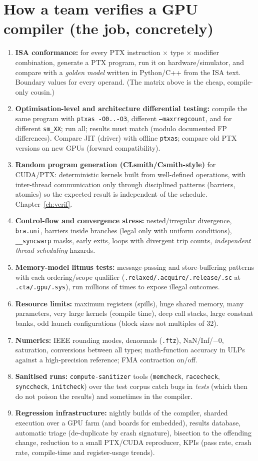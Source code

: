 \documentclass[10pt,a4paper,openany,oneside]{report}
\newcommand{\prio}[1]{\texorpdfstring{\ifcase#1\or{\color{gold}\ding{72}}\or{\color{gold}\ding{72}\ding{72}}\or{\color{gold}\ding{72}\ding{72}\ding{72}}\fi}{}}
\begin{document}
\section{How a team verifies a GPU compiler (the job, concretely) \prio{3}}
\begin{enumerate}[nosep]
\item \textbf{ISA conformance:} for every PTX instruction $\times$ type $\times$ modifier combination, generate a PTX program, run it on hardware/simulator, and compare with a \emph{golden model} written in Python/C++ from the ISA text. Boundary values for every operand. (The matrix above is the cheap, compile-only cousin.)
\item \textbf{Optimisation-level and architecture differential testing:} compile the same program with \texttt{ptxas -O0..-O3}, different \texttt{--maxrregcount}, and for different \texttt{sm\_XX}; run all; results must match (modulo documented FP differences). Compare JIT (driver) with offline \texttt{ptxas}; compare old PTX versions on new GPUs (forward compatibility).
\item \textbf{Random program generation (CLsmith/Csmith-style)} for CUDA/PTX: deterministic kernels built from well-defined operations, with inter-thread communication only through disciplined patterns (barriers, atomics) so the expected result is independent of the schedule. Chapter~\ref{ch:verif}.
\item \textbf{Control-flow and convergence stress:} nested/irregular divergence, \texttt{bra.uni}, barriers inside branches (legal only with uniform conditions), \texttt{\_\_syncwarp} masks, early exits, loops with divergent trip counts, \emph{independent thread scheduling} hazards.
\item \textbf{Memory-model litmus tests:} message-passing and store-buffering patterns with each ordering/scope qualifier (\texttt{.relaxed/.acquire/.release/.sc} at \texttt{.cta/.gpu/.sys}), run millions of times to expose illegal outcomes.
\item \textbf{Resource limits:} maximum registers (spills), huge shared memory, many parameters, very large kernels (compile time), deep call stacks, large constant banks, odd launch configurations (block sizes not multiples of 32).
\item \textbf{Numerics:} IEEE rounding modes, denormals (\texttt{.ftz}), NaN/Inf/$-0$, saturation, conversions between all types; math-function accuracy in ULPs against a high-precision reference; FMA contraction on/off.
\item \textbf{Sanitised runs:} \texttt{compute-sanitizer} tools (\texttt{memcheck}, \texttt{racecheck}, \texttt{synccheck}, \texttt{initcheck}) over the test corpus catch bugs in \emph{tests} (which then do not poison the results) and sometimes in the compiler.
\item \textbf{Regression infrastructure:} nightly builds of the compiler, sharded execution over a GPU farm (and boards for embedded), results database, automatic triage (de-duplicate by crash signature), bisection to the offending change, reduction to a small PTX/CUDA reproducer, KPIs (pass rate, crash rate, compile-time and register-usage trends).
\end{enumerate}
\end{document}
